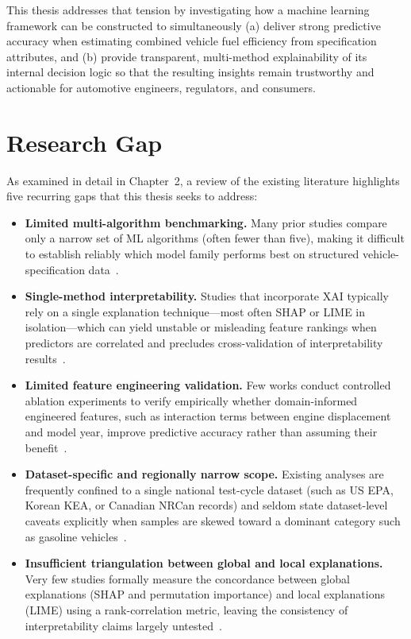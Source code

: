 This thesis addresses that tension by investigating how a machine learning framework can be constructed to simultaneously (a) deliver strong predictive accuracy when estimating combined vehicle fuel efficiency from specification attributes, and (b) provide transparent, multi-method explainability of its internal decision logic so that the resulting insights remain trustworthy and actionable for automotive engineers, regulators, and consumers.

\section{Research Gap}

As examined in detail in Chapter~2, a review of the existing literature highlights five recurring gaps that this thesis seeks to address:

\begin{itemize}
    \item \textbf{Limited multi-algorithm benchmarking.} Many prior studies compare only a narrow set of ML algorithms (often fewer than five), making it difficult to establish reliably which model family performs best on structured vehicle-specification data~\cite{atique2026explainable}\cite{alhakamy2023used}.

    \item \textbf{Single-method interpretability.} Studies that incorporate XAI typically rely on a single explanation technique---most often SHAP or LIME in isolation---which can yield unstable or misleading feature rankings when predictors are correlated and precludes cross-validation of interpretability results~\cite{farooq2025interpretable}\cite{ghadi2025explainable}\cite{mangalathu2020failure}\cite{haque2025ensemblexai}.

    \item \textbf{Limited feature engineering validation.} Few works conduct controlled ablation experiments to verify empirically whether domain-informed engineered features, such as interaction terms between engine displacement and model year, improve predictive accuracy rather than assuming their benefit~\cite{atique2026explainable}.

    \item \textbf{Dataset-specific and regionally narrow scope.} Existing analyses are frequently confined to a single national test-cycle dataset (such as US EPA, Korean KEA, or Canadian NRCan records) and seldom state dataset-level caveats explicitly when samples are skewed toward a dominant category such as gasoline vehicles~\cite{atique2026explainable}\cite{yoo2025machine}\cite{hamed2021fuel}.

    \item \textbf{Insufficient triangulation between global and local explanations.} Very few studies formally measure the concordance between global explanations (SHAP and permutation importance) and local explanations (LIME) using a rank-correlation metric, leaving the consistency of interpretability claims largely untested~\cite{atique2026explainable}.
\end{itemize}

